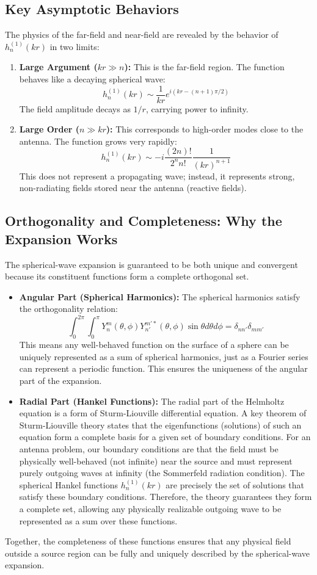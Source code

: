 \documentclass[11pt]{article}
\begin{document}
\subsection{Key Asymptotic Behaviors}
The physics of the far-field and near-field are revealed by the behavior of $h_n^{(1)}(kr)$ in two limits:
\begin{enumerate}
    \item \textbf{Large Argument ($kr \gg n$):} This is the far-field region. The function behaves like a decaying spherical wave:
    \[ h_n^{(1)}(kr) \sim \frac{1}{kr} e^{i(kr - (n+1)\pi/2)} \]
    The field amplitude decays as $1/r$, carrying power to infinity.
    \item \textbf{Large Order ($n \gg kr$):} This corresponds to high-order modes close to the antenna. The function grows very rapidly:
    \[ h_n^{(1)}(kr) \sim -i \frac{(2n)!}{2^n n!} \frac{1}{(kr)^{n+1}} \]
    This does not represent a propagating wave; instead, it represents strong, non-radiating fields stored near the antenna (reactive fields).
\end{enumerate}

\subsection{Orthogonality and Completeness: Why the Expansion Works}
The spherical-wave expansion is guaranteed to be both unique and convergent because its constituent functions form a complete orthogonal set.
\begin{itemize}
    \item \textbf{Angular Part (Spherical Harmonics):} The spherical harmonics satisfy the orthogonality relation:
    \[ \int_0^{2\pi} \int_0^\pi Y_n^m(\theta, \phi) Y_{n'}^{m' *}(\theta, \phi) \sin\theta d\theta d\phi = \delta_{nn'} \delta_{mm'} \]
    This means any well-behaved function on the surface of a sphere can be uniquely represented as a sum of spherical harmonics, just as a Fourier series can represent a periodic function. This ensures the uniqueness of the angular part of the expansion.
    \item \textbf{Radial Part (Hankel Functions):} The radial part of the Helmholtz equation is a form of Sturm-Liouville differential equation. A key theorem of Sturm-Liouville theory states that the eigenfunctions (solutions) of such an equation form a complete basis for a given set of boundary conditions. For an antenna problem, our boundary conditions are that the field must be physically well-behaved (not infinite) near the source and must represent purely outgoing waves at infinity (the Sommerfeld radiation condition). The spherical Hankel functions $h_n^{(1)}(kr)$ are precisely the set of solutions that satisfy these boundary conditions. Therefore, the theory guarantees they form a complete set, allowing any physically realizable outgoing wave to be represented as a sum over these functions.
\end{itemize}
Together, the completeness of these functions ensures that any physical field outside a source region can be fully and uniquely described by the spherical-wave expansion.
\end{document}

